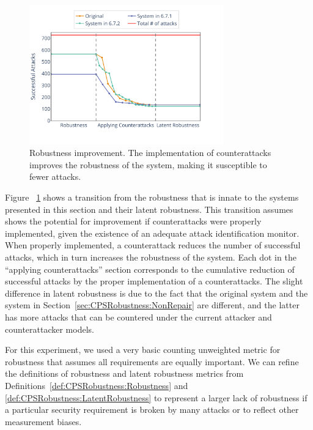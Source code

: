 {{\begin{figure}[t]
  \centering
  \includegraphics[width=0.75\textwidth]{Figures/Robustness.pdf} 
  \caption{Robustness improvement. The implementation of counterattacks improves the robustness of the system, making it susceptible to fewer attacks.}
  \label{fig:CPSRobustness:Robustness}
\end{figure}
Figure ~\ref{fig:CPSRobustness:Robustness} shows a transition from the robustness that is innate to the systems presented in this section and their latent robustness. This transition assumes shows the potential for improvement if counterattacks were properly implemented, given the existence of an adequate attack identification monitor. When properly implemented, a counterattack reduces the number of successful attacks, which in turn increases the robustness of the system. Each dot in the ``applying counterattacks'' section corresponds to the cumulative reduction of successful attacks by the proper implementation of a counterattacks. %
The slight difference in latent robustness is due to the fact that the original system and the system in Section~\ref{sec:CPSRobustness:NonRepair} are different, and the latter has more attacks that can be countered under the current attacker and counterattacker models. 

For this experiment, we used a very basic counting unweighted metric for robustness that assumes all requirements are equally important. We can refine the definitions of robustness and latent robustness metrics from Definitions~\ref{def:CPSRobustness:Robustness} and \ref{def:CPSRobustness:LatentRobustness} to represent a larger lack of robustness if a particular security requirement is broken by many attacks or to reflect other measurement biases. 

}}
